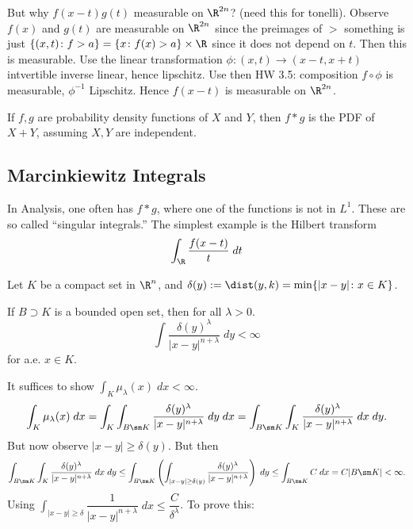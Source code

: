 But why $f(x-t)g(t)$ measurable on $\R^{2n}$? (need this for tonelli). Observe $f(x)$ and $g(t)$ are measurable on $\R^{2n}$ since the preimages of $>$ something is just $\{(x,t) \colon f>a\}= \{x \colon f(x)>a\} \times \R$ since it does not depend on $t$. Then this is measurable. Use the linear transformation $\phi: (x,t) \to (x-t,x+t)$ intvertible inverse linear, hence lipschitz. Use then HW 3.5: composition $f \circ \phi$ is measurable, $\phi^{-1}$ Lipschitz. Hence $f(x-t)$ is measurable on $\R^{2n}$. 






If $f,g$ are probability density functions of $X$ and $Y$, then $f*g$ is the PDF of $X+Y$, assuming $X,Y$ are independent. 





\subsection{Marcinkiewitz Integrals}

In Analysis, one often has $f*g$, where one of the functions is not in $L^1$. These are so called ``singular integrals.'' The simplest example is the Hilbert transform
	\[
	\int_\R \dfrac{f(x-t)}{t} \; dt
	\]


Let $K$ be a compact set in $\R^n$, and $\delta(y):= \dist(y,k)= \min\{|x-y| \colon x \in K\}$. 



\begin{thm}
If $B \supset K$ is a bounded open set, then for all $\lambda > 0$. 
	\[
	\int \dfrac{\delta(y)^\lambda}{|x-y|^{n+\lambda}} \; dy < \infty
	\]
for a.e. $x \in K$.
\end{thm}

\pf It suffices to show $\int_K \mu_\lambda(x) \; dx < \infty$.
	\[
	\int_K \mu_\lambda(x) \; dx = \int_K \int_{B \sm K} \dfrac{\delta(y)^\lambda}{|x-y|^{n+\lambda}} \; dy \; dx = \int_{B \sm K} \int_K \dfrac{\delta(y)^\lambda}{|x-y|^{n+\lambda}} \; dx \; dy.
	\]
But now observe $|x-y| \geq \delta(y)$. But then 
	\[
	\int_{B \sm K} \int_K \dfrac{\delta(y)^\lambda}{|x-y|^{n+\lambda}} \; dx \; dy \leq \int_{B \sm K} \left( \int_{|x-y| \geq \delta(y)} \dfrac{\delta(y)^\lambda}{|x-y|^{n+\lambda}} \right) \; dy \leq \int_{B \sm K} C \; dx = C |B \sm K|< \infty.
	\]
Using $\int_{|x-y| \geq \delta} \dfrac{1}{|x-y|^{n+\lambda}} \; dx \leq \dfrac{C}{\delta^\lambda}$. To prove this:

